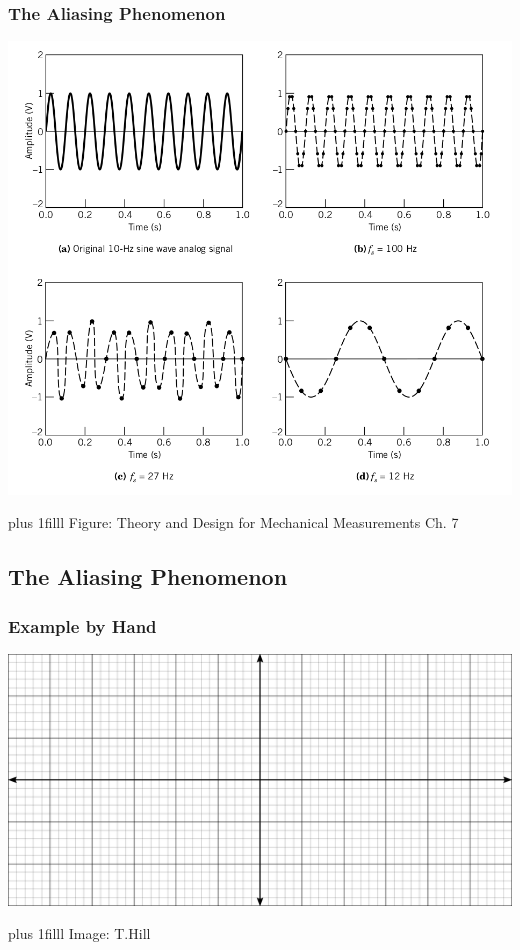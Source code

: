 \documentclass[fleqn]{beamer} %
\newcommand{\sectionIIIsubsectionIItitle}{The Aliasing Phenomenon}
\newcommand{\sectionIIIsubsectionIIItitle}{Example by Hand}
\newcommand{\btVFill}{\vskip0pt plus 1filll}
\begin{document}
			\begin{frame}
				\frametitle{\sectionIIIsubsectionIItitle}

				\bigskip
				\includegraphics[scale=.2]{images/aliasing_fig7_2.png}


				\btVFill
				\tiny{Figure: Theory and Design for Mechanical Measurements Ch. 7}		

			\end{frame}

		\subsection{\sectionIIIsubsectionIItitle}\label{sectionIIIsubsectionIII}

			\begin{frame}
				\frametitle{\sectionIIIsubsectionIIItitle}

				\bigskip
				\includegraphics[scale=.35]{images/cartesian_6x12.png}


				\btVFill
				\tiny{Image: T.Hill}

			\end{frame}
\end{document}
